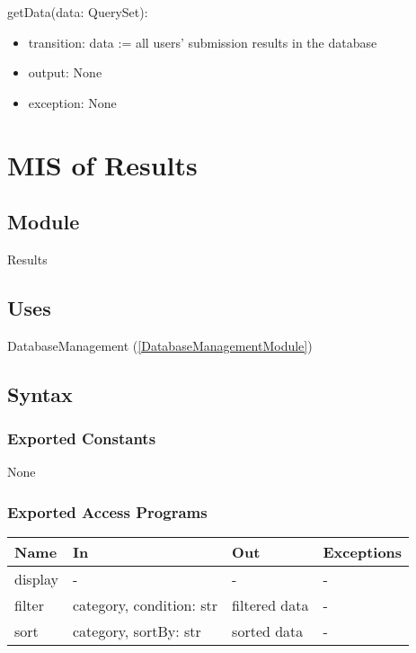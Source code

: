 \documentclass[12pt, titlepage]{article}
\begin{document}
\noindent getData(data: QuerySet):
\begin{itemize}
\item transition: data := all users' submission results in the database
\item output: None
\item exception: None
\end{itemize}

\newpage

\section{MIS of Results} \label{ResultsModule}

\subsection{Module}

Results

\subsection{Uses}

DatabaseManagement (\ref{DatabaseManagementModule})

\subsection{Syntax}

\subsubsection{Exported Constants}

None

\subsubsection{Exported Access Programs}

\begin{center}
\begin{tabular}{p{2cm} p{4cm} p{4cm} p{2cm}}
\hline
\textbf{Name} & \textbf{In} & \textbf{Out} & \textbf{Exceptions} \\
\hline
display & - & - & - \\
filter & category, condition: str & filtered data & - \\
sort & category, sortBy: str & sorted data & - \\
\hline
\end{tabular}
\end{center}
\end{document}
